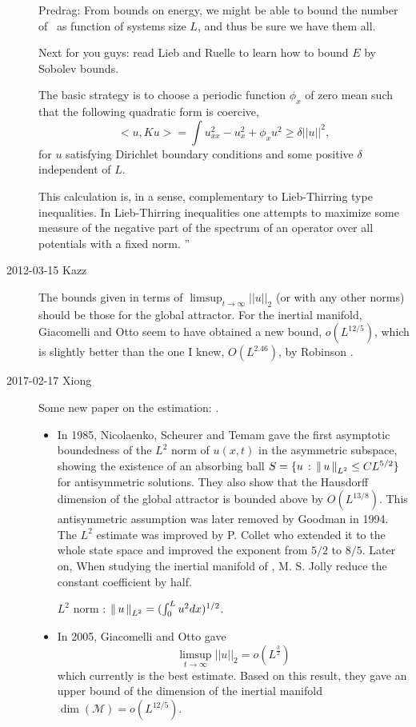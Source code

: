 \begin{description}
  Predrag: From bounds on energy, we might be able to bound the number of \eqva\ as
  function of systems size $L$, and thus be sure we have them all.

  Next for you guys: read Lieb and Ruelle to learn how to bound $E$  by
  Sobolev bounds.

  The basic strategy is to choose a periodic function $\phi_x$ of zero mean
  such that the following quadratic form is coercive,
  \[
    <\!\!u, K u\!\!>= \int u_{xx}^2 - u_x^2 + \phi_x u^2 \ge \delta |\!|u|\!|^2,
  \]
  for $u$ satisfying Dirichlet boundary conditions and some positive
  $\delta$ independent of $L$.

  This calculation is, in a sense, complementary to Lieb-Thirring type
  inequalities. In Lieb-Thirring inequalities one attempts to maximize some
  measure of the negative part of the spectrum of an operator over all
  potentials with a fixed norm.
  ''

\item[2012-03-15 Kazz]
  The bounds given in terms of $\limsup_{t \rightarrow \infty} |\!|u|\!|_2$
  (or with any other norms) should be those for the global attractor.
  For the inertial manifold,
  Giacomelli and Otto  seem to have obtained a new bound,
  $o(L^{12/5})$, which is slightly better than the one I knew, $O(L^{2.46})$,
  by Robinson .

\item[2017-02-17 Xiong]
  Some new paper on the estimation: .
  

  \begin{itemize}
  \item
    In 1985, Nicolaenko, Scheurer and Temam gave the first asymptotic 
    boundedness 
    of the $L^2$ norm of $u(x,t)$ in the asymmetric subspace,
    showing the existence of  an absorbing ball 
    $S = \{u\,:\, \left\Arrowvert \, u \, \right\Arrowvert_{L^2} \le C L^{5/2}\}$
    for antisymmetric solutions. They also show that the Hausdorff dimension of the 
    global attractor is bounded above by $O(L^{13/8})$.
    This antisymmetric assumption was later removed by
    Goodman in 1994.
    The $L^2$ estimate was improved by P. Collet \etal{}
    who extended it to the whole state space and improved the 
    exponent from $5/2$ to $8/5$. Later on, When studying the inertial
    manifold of \KSe, M. S. Jolly \etal{} 
    reduce the constant coefficient by half.

    $L^2$ norm : $\left\Arrowvert \, u \, \right\Arrowvert_{L^2} = (\int_{0}^L u^2 dx)^{1/2}$.
  \item
    In 2005, Giacomelli and Otto gave 
    \[
      \limsup_{t\to\infty}|\!|u|\!|_2 = o(L^{\frac{3}{2}})
    \]
    which currently is the best estimate. Based on this result, they
    gave an upper bound of the dimension of the inertial manifold
    $\dim(\mathcal{M}) = o(L^{12/5})$.


\end{itemize}
\end{description}
